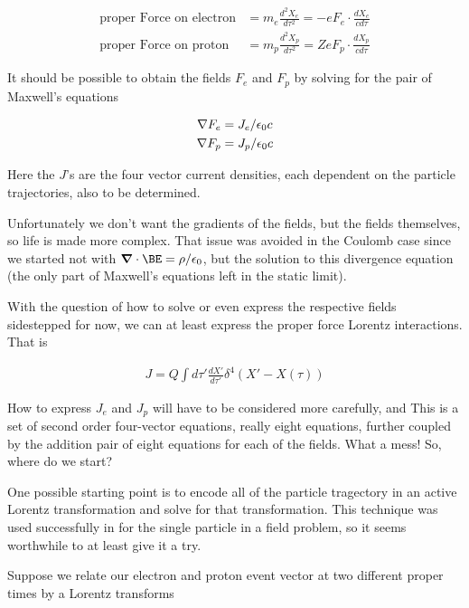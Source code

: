 \begin{align}\label{eqn:nuclearInteraction:hoo6}
\text{proper Force on electron} &= m_e \frac{d^2 X_e}{d\tau^2} = - e F_e \cdot \frac{d X_e}{c d\tau} \\
\text{proper Force on proton} &= m_p \frac{d^2 X_p}{d\tau^2} = Z e F_p \cdot \frac{d X_p}{c d\tau}
\end{align}


It should be possible to obtain the fields $F_e$ and $F_p$ by solving for the pair of Maxwell's equations

\begin{align}\label{eqn:nuclearInteraction:hoo4}
\nabla F_e &= J_e/\epsilon_0 c \\
\nabla F_p &= J_p/\epsilon_0 c
\end{align}

Here the $J$'s are the four vector current densities, each dependent on the particle trajectories, also to be determined.

Unfortunately we don't want the gradients of the fields, but the fields themselves, so life is made more complex.  That issue was avoided in the Coulomb case since we started not with $\spacegrad \cdot \BE = \rho/\epsilon_0$, but the solution to this divergence equation (the only part of Maxwell's equations left in the static limit).





With the question of how to solve or even express the respective fields sidestepped for now, we can at least express the proper force Lorentz interactions.  That is

\begin{align}\label{eqn:nuclearInteraction:hoo5}
J = Q \int d\tau' \frac{dX'}{d\tau'} \delta^4 (X' - X(\tau))
\end{align}


How to express $J_e$ and $J_p$ will have to be considered more carefully, and 
This is a set of second order four-vector equations, really eight equations, further coupled by the addition pair of eight equations for each of the fields.  What a mess!  So, where do we start?

One possible starting point is to encode all of the particle tragectory in an active Lorentz transformation and solve for that transformation.  This technique was used successfully in \cite{doran2003gap} for the single particle in a field problem, so it seems worthwhile to at least give it a try.

Suppose we relate our electron and proton event vector at two different proper times by a Lorentz transforms

